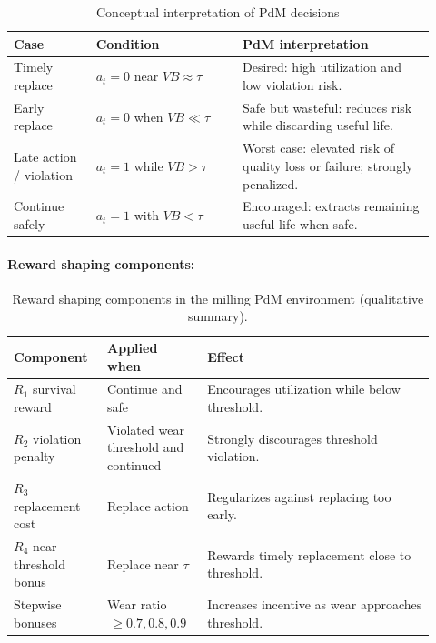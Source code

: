 \documentclass[sn-basic]{sn-jnl}%
\begin{document}
\begin{table}[htbp]
	\centering
	\caption{Conceptual interpretation of PdM decisions}
	\label{tab:cost_view}
	\begin{tabular}{L{0.18\linewidth} L{0.32\linewidth} L{0.42\linewidth}}
		\toprule
		\textbf{Case} & \textbf{Condition} & \textbf{PdM interpretation}\\
		\midrule
		Timely replace & $a_t=0$ near $VB\approx\tau$ & Desired: high utilization and low violation risk.\\
		Early replace & $a_t=0$ when $VB\ll\tau$ & Safe but wasteful: reduces risk while discarding useful life.\\
		Late action / violation & $a_t=1$ while $VB>\tau$ & Worst case: elevated risk of quality loss or failure; strongly penalized.\\
		Continue safely & $a_t=1$ with $VB<\tau$ & Encouraged: extracts remaining useful life when safe.\\
		\bottomrule
	\end{tabular}
\end{table}

\paragraph{Reward shaping components:}
\begin{table}[htbp]
	\centering
	\caption{Reward shaping components in the milling PdM environment (qualitative summary).}
	\label{tab:reward_components}
	\begin{tabular}{L{0.20\linewidth} L{0.22\linewidth} L{0.50\linewidth}}
		\toprule
		\textbf{Component} & \textbf{Applied when} & \textbf{Effect}\\
		\midrule
		$R_1$ survival reward & Continue and safe & Encourages utilization while below threshold.\\
		$R_2$ violation penalty & Violated wear threshold and continued & Strongly discourages threshold violation.\\
		$R_3$ replacement cost & Replace action & Regularizes against replacing too early.\\
		$R_4$ near-threshold bonus & Replace near $\tau$ & Rewards timely replacement close to threshold.\\
		Stepwise bonuses & Wear ratio $\,\ge 0.7, 0.8, 0.9$ & Increases incentive as wear approaches threshold.\\
		\bottomrule
	\end{tabular}
\end{table}
\end{document}
